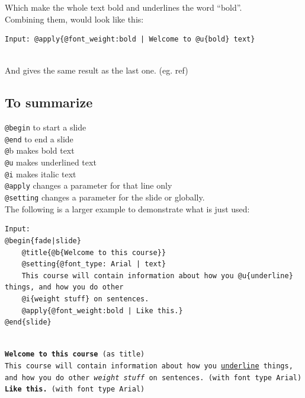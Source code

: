Which make the whole text bold and underlines the word ``bold''.\\

Combining them, would look like this:\\

\begin{lstlisting}[frame=single]
Input: @apply{@font_weight:bold | Welcome to @u{bold} text}
\end{lstlisting}

 \\

And gives the same result as the last one. (eg. ref)

\subsection*{To summarize}
\texttt{@begin} to start a slide\\
\texttt{@end} to end a slide\\
\texttt{@}b makes bold text \\
\texttt{@u} makes underlined text \\
\texttt{@i} makes italic text \\
\texttt{@apply} changes a parameter for that line only\\
\texttt{@setting} changes a parameter for the slide or globally.\\

The following is a larger example to demonstrate what is just used:\\

\begin{lstlisting}[frame=single]
Input:
@begin{fade|slide}
    @title{@b{Welcome to this course}}
    @setting{@font_type: Arial | text}
    This course will contain information about how you @u{underline} things, and how you do other    
    @i{weight stuff} on sentences.
    @apply{@font_weight:bold | Like this.}
@end{slide}
\end{lstlisting}

\texttt{ \\
\textbf{Welcome to this course} (as title) \\
This course will contain information about how you \underline{underline} things, and how you do other \textit{weight stuff} on sentences. (with font type Arial) \\
\textbf{Like this.}  (with font type Arial)}
\\ \\

